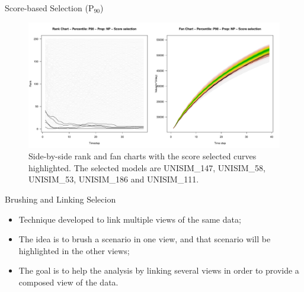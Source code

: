 \documentclass{beamer}
\begin{document}
\begin{frame}{Score-based Selection (P$_{90}$)}
  \begin{figure}[H]
    \centering
    \includegraphics[width=\columnwidth]{rank-fan-score-p90.pdf}
    \caption{Side-by-side rank and fan charts with the score selected curves highlighted. The selected models are UNISIM\_147, UNISIM\_58, UNISIM\_53, UNISIM\_186 and UNISIM\_111.}
    \label{fig:rank-fan-score-p90}
  \end{figure}
\end{frame}

\begin{frame}{Brushing and Linking Selecion}
  \begin{itemize}
    \item Technique developed to link multiple views of the same data;
    \item The idea is to brush a scenario in one view, and that scenario will be highlighted in the other views;
    \item The goal is to help the analysis by linking several views in order to provide a composed view of the data.
  \end{itemize}
\end{frame}
\end{document}

